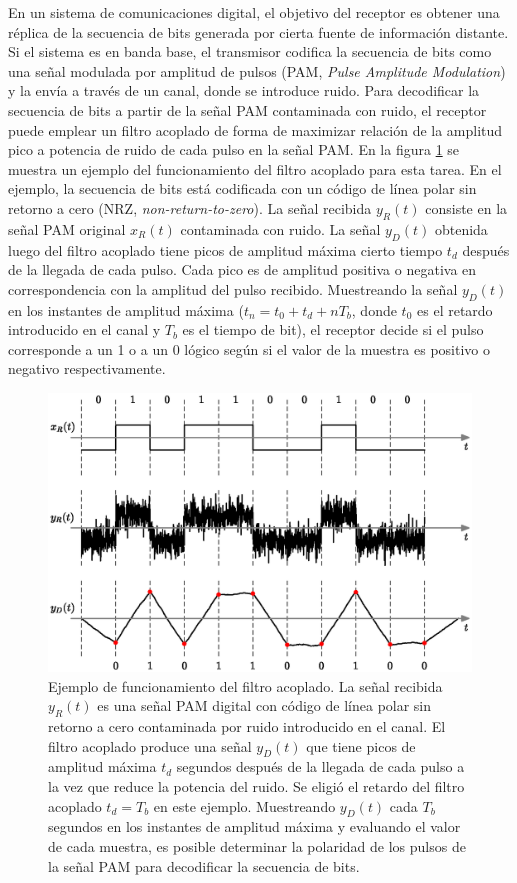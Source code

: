 \documentclass[a4paper]{article}
\begin{document}
En un sistema de comunicaciones digital, el objetivo del receptor es obtener una réplica de la secuencia de bits generada por cierta fuente de información distante. Si el sistema es en banda base, el transmisor codifica la secuencia de bits como una señal modulada por amplitud de pulsos (PAM, \emph{Pulse Amplitude Modulation}) y la envía a través de un canal, donde se introduce ruido. Para decodificar la secuencia de bits a partir de la señal PAM contaminada con ruido, el receptor puede emplear un filtro acoplado de forma de maximizar relación de la amplitud pico a potencia de ruido de cada pulso en la señal PAM. En la figura \ref{fig:matched_filter_operating} se muestra un ejemplo del funcionamiento del filtro acoplado para esta tarea. En el ejemplo, la secuencia de bits está codificada con un código de línea polar sin retorno a cero (NRZ, \emph{non-return-to-zero}). La señal recibida \(y_R(t)\) consiste en la señal PAM original \(x_R(t)\) contaminada con ruido. La señal \(y_D(t)\) obtenida luego del filtro acoplado tiene picos de amplitud máxima cierto tiempo \(t_d\) después de la llegada de cada pulso. Cada pico es de amplitud positiva o negativa en correspondencia con la amplitud del pulso recibido. Muestreando la señal \(y_D(t)\) en los instantes de amplitud máxima (\(t_n=t_0+t_d+nT_b\), donde \(t_0\) es el retardo introducido en el canal y \(T_b\) es el tiempo de bit), el receptor decide si el pulso corresponde a un 1 o a un 0 lógico según si el valor de la muestra es positivo o negativo respectivamente.
\begin{figure}[!htb]
\begin{center}
\includegraphics[width=0.9\columnwidth]{figuras/matched_filter_operating.eps}
\caption{\label{fig:matched_filter_operating} Ejemplo de funcionamiento del filtro acoplado. La señal recibida \(y_R(t)\) es una señal PAM digital con código de línea polar sin retorno a cero contaminada por ruido introducido en el canal. El filtro acoplado produce una señal \(y_D(t)\) que tiene picos de amplitud máxima \(t_d\) segundos después de la llegada de cada pulso a la vez que reduce la potencia del ruido. Se eligió el retardo del filtro acoplado \(t_d=T_b\) en este ejemplo. Muestreando \(y_D(t)\) cada \(T_b\) segundos en los instantes de amplitud máxima y evaluando el valor de cada muestra, es posible determinar la polaridad de los pulsos de la señal PAM para decodificar la secuencia de bits.}
\end{center}
\end{figure}
\end{document}
